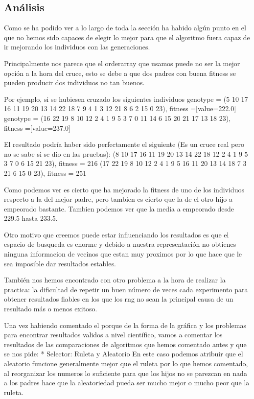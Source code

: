 \documentclass[a4paper,12pt,titlepage]{article}
\begin{document}
\subsection{Análisis}
Como se ha podido ver a lo largo de toda la sección ha habido algún punto en el que no hemos sido capaces de elegir lo mejor para que el algoritmo fuera capaz de ir mejorando los individuos con las generaciones. 


Principalmente nos parece que el orderarray que usamos puede no ser la mejor opción a la hora del cruce, esto se debe a que dos padres con buena fitness se pueden producir dos individuos no tan buenos.

Por ejemplo, si se hubiesen cruzado los siguientes individuos
genotype = (5 10 17 16 11 19 20 13 14 22 18 7 9 4 1 3 12 21 8 6 2 15 0 23), fitness =[value=222.0]
genotype = (16 22 19 8 10 12 2 4 1 9 5 3 7 0 11 14 6 15 20 21 17 13 18 23), fitness =[value=237.0]

El resultado podría haber sido perfectamente el siguiente (Es un cruce real pero no se sabe si se dio en las pruebas):
(8 10 17 16 11 19 20 13 14 22 18 12 2 4 1 9 5 3 7 0 6 15 21 23), fitness = 216
(17 22 19 8 10 12 2 4 1 9 5 16 11 20 13 14 18 7 3 21 6 15 0 23), fitness = 251

Como podemos ver es cierto que ha mejorado la fitness de uno de los individuos respecto a la del mejor padre, pero tambien es cierto que la de el otro hijo a empeorado bastante. Tambien podemos ver que la media a empeorado desde 229.5 hasta 233.5.

Otro motivo que creemos puede estar influenciando los resultados es que el espacio de busqueda es enorme y debido a nuestra representación no obtienes ninguna informacion de vecinos que estan muy proximos por lo que hace que le sea imposible dar resultados estables.

También nos hemos encontrado con otro problema a la hora de realizar la practica: la dificultad de repetir un buen número de veces cada experimento para obtener resultados fiables en los que los rng no sean la principal causa de un resultado más o menos exitoso.

Una vez habiendo comentado el porque de la forma de la gráfica y los problemas para encontrar resultados validos a nivel científico, vamos a comentar los resultados de las comparaciones de algoritmos que hemos comentado antes y que se nos pide:
 * Selector: Ruleta y Aleatorio
         En este caso podemos atribuir que el aleatorio funcione generalmente mejor que el ruleta por lo que hemos comentado, al reorganizar los numeros lo suficiente para que los hijos no se parezcan en nada a los padres hace que la aleatoriedad pueda ser mucho mejor o mucho peor que la ruleta.
\end{document}
